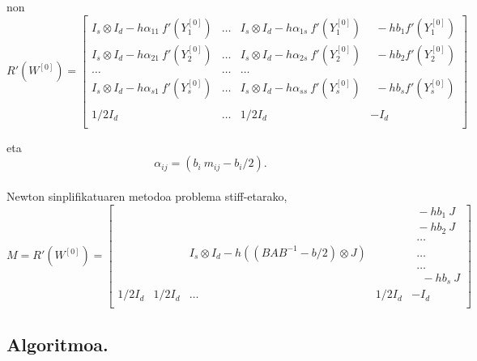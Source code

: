 non 
\begin{equation*}
R'(W^{[0]})=\begin{bmatrix}
I_s \otimes I_d - h \alpha_{11} \ f'(Y_1^{[0]})   & \dots & I_s \otimes I_d - h \alpha_{1s} \  f'(Y_1^{[0]}) & \ \ -hb_1 f'(Y_1^{[0]}) \\
I_s \otimes I_d - h \alpha_{21} \ f'(Y_2^{[0]})   & \dots & I_s \otimes I_d - h \alpha_{2s} \  f'(Y_2^{[0]}) & \ \ -hb_2 f'(Y_2^{[0]})
\\
\dots          & \dots & \dots \\
I_s \otimes I_d - h \alpha_{s1} \ f'(Y_s^{[0]})   & \dots & I_s \otimes I_d - h \alpha_{ss} \  f'(Y_s^{[0]}) & \ \ -hb_s f'(Y_s^{[0]}) \\
\\
1/2 I_d                      & \dots & 1/2 I_d                      & -I_d \\
\end{bmatrix}
\end{equation*}

eta 
\begin{equation*}
\alpha_{ij}=(b_i \ m_{ij}-b_i/2).
\end{equation*}

\paragraph*{} Newton sinplifikatuaren metodoa problema stiff-etarako,
\begin{equation*}
M=R'(W^{[0]})=
\begin{bmatrix}
    &      &      &  & \ \ -hb_1 \ J \\
    &      &      &  & \ \ -hb_2 \ J \\
    &      &      &  & \ \ \dots     \\    
    &  & I_s \otimes I_d - h ((BAB^{-1}-b/2)\otimes J) & & \ \ \dots \\
    &      &      &  & \ \ \dots      \\
    &      &      &  & \ \ \ \ -hb_s \ J      \\
1/2 I_d & 1/2 I_d & \dots & 1/2 I_d &  -I_d\\ 
\end{bmatrix}
\end{equation*}

\subsection*{Algoritmoa.}

